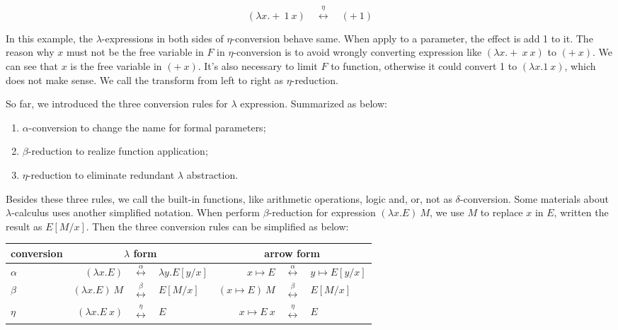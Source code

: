 \documentclass[b5paper]{article}
\begin{document}
\[
(\lambda x . +\ 1\ x) \quad \overset{\eta}{\longleftrightarrow} \quad (+\ 1)
\]

In this example, the $\lambda$-expressions in both sides of $\eta$-conversion behave same. When apply to a parameter, the effect is add 1 to it. The reason why $x$ must not be the free variable in $F$ in $\eta$-conversion is to avoid wrongly converting expression like $(\lambda x. +\ x\ x)$ to $(+\ x)$. We can see that $x$ is the free variable in $(+\ x)$. It's also necessary to limit $F$ to function, otherwise it could convert 1 to $(\lambda x . 1\ x)$, which does not make sense. We call the transform from left to right as $\eta$-reduction.

So far, we introduced the three conversion rules for $\lambda$ expression. Summarized as below:

\begin{enumerate}
\item $\alpha$-conversion to change the name for formal parameters;
\item $\beta$-reduction to realize function application;
\item $\eta$-reduction to eliminate redundant $\lambda$ abstraction.
\end{enumerate}

Besides these three rules, we call the built-in functions, like arithmetic operations, logic and, or, not as $\delta$-conversion. Some materials about $\lambda$-calculus uses another simplified notation. When perform $\beta$-reduction for expression $(\lambda x. E)\ M$, we use $M$ to replace $x$ in $E$, written the result as $E[M/x]$. Then the three conversion rules can be simplified as below:

\vspace{5mm}
\begin{tabular}{|l|rcl|rcl|}
\hline
conversion & \multicolumn{3}{|c|}{$\lambda$ form} & \multicolumn{3}{|c|}{arrow form} \\
\hline
$\alpha$ & $(\lambda x . E)$ & $\overset{\alpha}{\longleftrightarrow}$ & $\lambda y . E[y/x]$
         & $x \mapsto E$ & $\overset{\alpha}{\longleftrightarrow}$ & $y \mapsto E[y/x]$ \\
\hline
$\beta$  & $(\lambda x . E)\ M$ & $\overset{\beta}{\longleftrightarrow}$ & $E[M/x]$
         & $(x \mapsto E)\ M$ & $\overset{\beta}{\longleftrightarrow}$ & $E[M/x]$ \\
\hline
$\eta$   & $(\lambda x . E\ x)$ & $\overset{\eta}{\longleftrightarrow}$ & $E$
         & $x \mapsto E\ x$ & $\overset{\eta}{\longleftrightarrow}$ & $E$ \\
\hline
\end{tabular}
\vspace{5mm}
\end{document}
